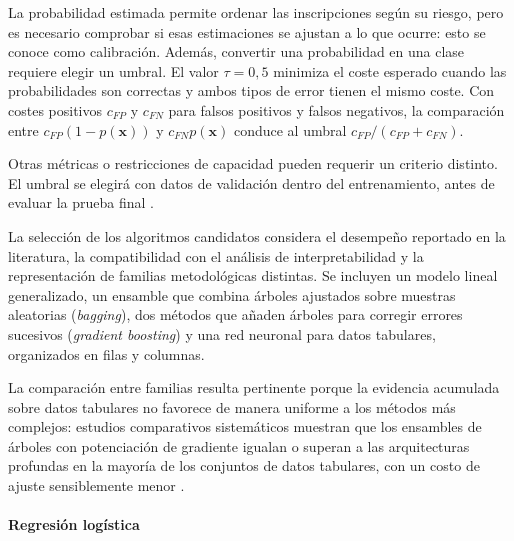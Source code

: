 La probabilidad estimada permite ordenar las inscripciones según su riesgo, pero es necesario comprobar si esas estimaciones se ajustan a lo que ocurre: esto se conoce como calibración. Además, convertir una probabilidad en una clase requiere elegir un umbral. El valor $\tau=0{,}5$ minimiza el coste esperado cuando las probabilidades son correctas y ambos tipos de error tienen el mismo coste. Con costes positivos $c_{FP}$ y $c_{FN}$ para falsos positivos y falsos negativos, la comparación entre $c_{FP}(1-p(\mathbf x))$ y $c_{FN}p(\mathbf x)$ conduce al umbral $c_{FP}/(c_{FP}+c_{FN})$.

Otras métricas o restricciones de capacidad pueden requerir un criterio distinto. El umbral se elegirá con datos de validación dentro del entrenamiento, antes de evaluar la prueba final \cite{revthreshold}.

La selección de los algoritmos candidatos considera el desempeño reportado en la literatura, la compatibilidad con el análisis de interpretabilidad y la representación de familias metodológicas distintas. Se incluyen un modelo lineal generalizado, un ensamble que combina árboles ajustados sobre muestras aleatorias (\textit{bagging}), dos métodos que añaden árboles para corregir errores sucesivos (\textit{gradient boosting}) y una red neuronal para datos tabulares, organizados en filas y columnas. 

La comparación entre familias resulta pertinente porque la evidencia acumulada sobre datos tabulares no favorece de manera uniforme a los métodos más complejos: estudios comparativos sistemáticos muestran que los ensambles de árboles con potenciación de gradiente igualan o superan a las arquitecturas profundas en la mayoría de los conjuntos de datos tabulares, con un costo de ajuste sensiblemente menor \cite{shwartzziv2022,grinsztajn2022}.

\paragraph{Regresión logística}

